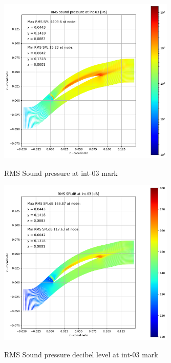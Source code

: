 \begin{figure}[ht]
  \centering
  \includegraphics[width=0.75\textwidth]{Figures/int-03-rms-spl.png} \label{int-03-rms-spl}
  \caption{RMS Sound pressure at int-03 mark}
  
  \vspace*{\floatsep}%

  \includegraphics[width=0.75\textwidth]{Figures/int-03-rms-spldb.png} \label{int-03-rms-spldb}
  \caption{RMS Sound pressure decibel level at int-03 mark}
\end{figure}
